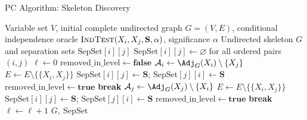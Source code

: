 \begin{algorithm}[h!]
\caption{PC Algorithm: Skeleton Discovery}
\label{alg:pc-skeleton}
\begin{algorithmic}[1]
\Require Variable set $V$, initial complete undirected graph $G=(V,E)$, conditional independence oracle $\Call{IndTest}{X_i,X_j,\mathbf{S},\alpha}$, significance $\alpha$
\Ensure Undirected skeleton $G$ and separation sets $\mathrm{SepSet}[i][j]$
\State $\mathrm{SepSet}[i][j] \gets \varnothing$ for all ordered pairs $(i,j)$
\State $\ell \gets 0$
\Repeat
    \State $\mathrm{removed\_in\_level} \gets \textbf{false}$
        \State $\mathcal{A}_i \gets \Adj_G(X_i) \setminus \{X_j\}$ 
                    \State $E \gets E \setminus \{\{X_i,X_j\}\}$ 
                    \State $\mathrm{SepSet}[i][j] \gets \mathbf{S}$; \quad $\mathrm{SepSet}[j][i] \gets \mathbf{S}$ 
                    \State $\mathrm{removed\_in\_level} \gets \textbf{true}$
                    \State \textbf{break} 
                \EndIf
            \EndFor
        \EndIf
            \State $\mathcal{A}_j \gets \Adj_G(X_j) \setminus \{X_i\}$
                        \State $E \gets E \setminus \{\{X_i,X_j\}\}$
                        \State $\mathrm{SepSet}[i][j] \gets \mathbf{S}$; \quad $\mathrm{SepSet}[j][i] \gets \mathbf{S}$
                        \State $\mathrm{removed\_in\_level} \gets \textbf{true}$
                        \State \textbf{break}
                    \EndIf
                \EndFor
            \EndIf
        \EndIf
    \EndFor
    \State $\ell \gets \ell + 1$
\State \Return $G,\ \mathrm{SepSet}$
\end{algorithmic}
\end{algorithm}



